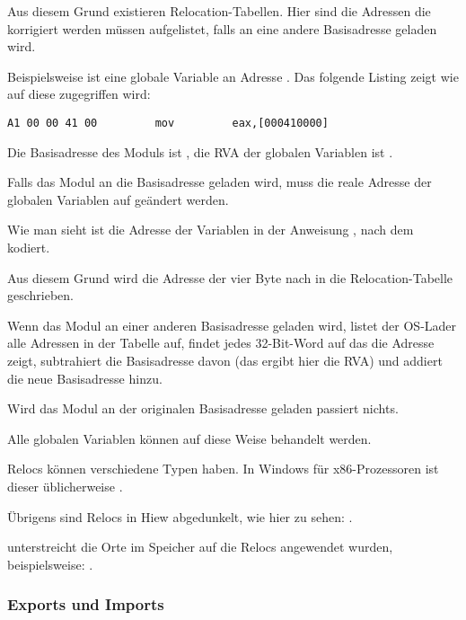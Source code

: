 Aus diesem Grund existieren Relocation-Tabellen. Hier sind die Adressen die korrigiert
werden müssen aufgelistet, falls an eine andere Basisadresse geladen wird.

Beispielsweise ist eine globale Variable an Adresse . Das folgende
Listing zeigt wie auf diese zugegriffen wird:

\begin{lstlisting}
A1 00 00 41 00         mov         eax,[000410000]
\end{lstlisting}

Die Basisadresse des Moduls ist , die \ac{RVA} der globalen Variablen
ist .

Falls das Modul an die Basisadresse  geladen wird, muss die reale
Adresse der globalen Variablen auf  geändert werden.


Wie man sieht ist die Adresse der Variablen in der Anweisung , nach dem
 kodiert.

Aus diesem Grund wird die Adresse der vier Byte nach  in die
Relocation-Tabelle geschrieben.

Wenn das Modul an einer anderen Basisadresse geladen wird, listet der \ac{OS}-Lader
alle Adressen in der Tabelle auf, findet jedes 32-Bit-Word auf das die Adresse zeigt,
subtrahiert die Basisadresse davon (das ergibt hier die \ac{RVA}) und addiert die
neue Basisadresse hinzu.

Wird das Modul an der originalen Basisadresse geladen passiert nichts.

Alle globalen Variablen können auf diese Weise behandelt werden.

Relocs können verschiedene Typen haben. In Windows für x86-Prozessoren ist dieser
üblicherweise .


Übrigens sind Relocs in Hiew abgedunkelt, wie hier zu sehen: .

\myindex{\olly}
\olly unterstreicht die Orte im Speicher auf die Relocs angewendet wurden,
beispielsweise: .

\subsubsection{Exports und Imports}

